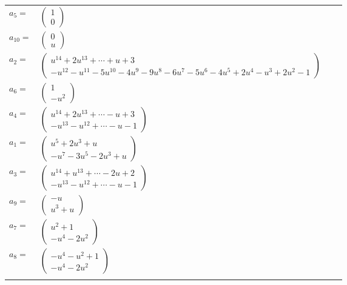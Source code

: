 \documentclass[1p]{elsarticle_modified}
\theoremstyle{definition}
\begin{document}
\begin{tabular}{m{7pt} m{180pt} m{7pt} m{180pt} }
\flushright $a_{5}=$&$\begin{pmatrix}1\\0\end{pmatrix}$ \\
\flushright $a_{10}=$&$\begin{pmatrix}0\\u\end{pmatrix}$ \\
\flushright $a_{2}=$&$\begin{pmatrix}u^{14}+2 u^{13}+\cdots+u+3\\- u^{12}- u^{11}-5 u^{10}-4 u^9-9 u^8-6 u^7-5 u^6-4 u^5+2 u^4- u^3+2 u^2-1\end{pmatrix}$ \\
\flushright $a_{6}=$&$\begin{pmatrix}1\\- u^2\end{pmatrix}$ \\
\flushright $a_{4}=$&$\begin{pmatrix}u^{14}+2 u^{13}+\cdots- u+3\\- u^{13}- u^{12}+\cdots- u-1\end{pmatrix}$ \\
\flushright $a_{1}=$&$\begin{pmatrix}u^5+2 u^3+u\\- u^7-3 u^5-2 u^3+u\end{pmatrix}$ \\
\flushright $a_{3}=$&$\begin{pmatrix}u^{14}+u^{13}+\cdots-2 u+2\\- u^{13}- u^{12}+\cdots- u-1\end{pmatrix}$ \\
\flushright $a_{9}=$&$\begin{pmatrix}- u\\u^3+u\end{pmatrix}$ \\
\flushright $a_{7}=$&$\begin{pmatrix}u^2+1\\- u^4-2 u^2\end{pmatrix}$ \\
\flushright $a_{8}=$&$\begin{pmatrix}- u^4- u^2+1\\- u^4-2 u^2\end{pmatrix}$\\&\end{tabular}
\end{document}
